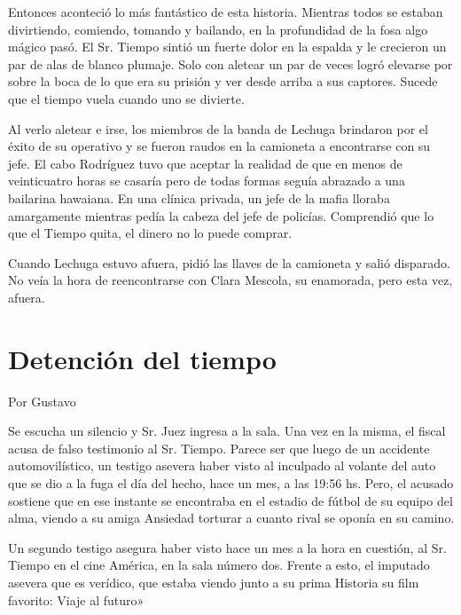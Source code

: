 \documentclass[11pt,twoside,openright,a5paper]{book}
\begin{document}
\vspace{0.5cm}

Entonces aconteció lo más fantástico de esta historia. Mientras todos se estaban divirtiendo, comiendo, tomando y bailando, en la profundidad de la fosa algo mágico pasó. El Sr. Tiempo sintió un fuerte dolor en la espalda y le crecieron un par de alas de blanco plumaje. Solo con aletear un par de veces logró elevarse por sobre la boca de lo que era su prisión y ver desde arriba a sus captores. Sucede que el tiempo vuela cuando uno se divierte.

Al verlo aletear e irse, los miembros de la banda de Lechuga brindaron por el éxito de su operativo y se fueron raudos en la camioneta a encontrarse con su jefe. El cabo Rodríguez tuvo que aceptar la realidad de que en menos de veinticuatro horas se casaría pero de todas formas seguía abrazado a una bailarina hawaiana. En una clínica privada, un jefe de la mafia lloraba amargamente mientras pedía la cabeza del jefe de policías. Comprendió que lo que el Tiempo quita, el dinero no lo puede comprar.

\vspace{0.5cm}

Cuando Lechuga estuvo afuera, pidió las llaves de la camioneta y salió disparado. No veía la hora de reencontrarse con Clara Mescola, su enamorada, pero esta vez, afuera.

\section*{Detención del tiempo}

\begin{flushright}Por Gustavo\end{flushright}

Se escucha un silencio y Sr. Juez ingresa a la sala. Una vez en la misma, el fiscal acusa de falso testimonio al Sr. Tiempo. Parece ser que luego de un accidente automovilístico, un testigo asevera haber visto al inculpado al volante del auto que se dio a la fuga el día del hecho, hace un mes, a las 19:56 hs. Pero, el acusado sostiene que en ese instante se encontraba en el estadio de fútbol de su equipo del alma, viendo a su amiga Ansiedad torturar a cuanto rival se oponía en su camino.

Un segundo testigo asegura haber visto hace un mes a la hora en cuestión, al Sr. Tiempo en el cine América, en la sala número dos. Frente a esto, el imputado asevera que es verídico, que estaba viendo junto a su prima Historia su film favorito: Viaje al futuro»
\end{document}
